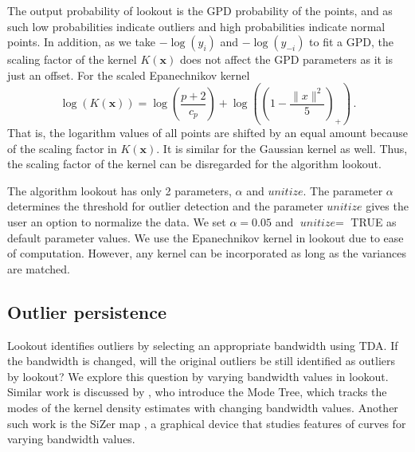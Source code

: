 \documentclass[11pt,a4paper,]{article}
\theoremstyle{definition}
\theoremstyle{definition}
\theoremstyle{definition}
\theoremstyle{remark}
\begin{document}
The output probability of lookout is the GPD probability of the points, and as such low probabilities indicate outliers and high probabilities indicate normal points. In addition, as we take \(-\log(y_i)\) and \(-\log(y_{-i})\) to fit a GPD, the scaling factor of the kernel \(K(\bm{x})\) does not affect the GPD parameters as it is just an offset. For the scaled Epanechnikov kernel
\begin{equation}\label{eq:lookout1}
    \log(K(\bm{x}))  = \log\left( \frac{p+2}{c_p}\right) + \log\left( \left(1 -\frac{\| x \|^2}{5} \right)_+\right)\, . 
\end{equation}
That is, the logarithm values of all points are shifted by an equal amount because of the scaling factor in \(K(\bm{x})\). It is similar for the Gaussian kernel as well. Thus, the scaling factor of the kernel can be disregarded for the algorithm lookout.

The algorithm lookout has only 2 parameters, \(\alpha\) and \(\textit{unitize}\). The parameter \(\alpha\) determines the threshold for outlier detection and the parameter \(\textit{unitize}\) gives the user an option to normalize the data. We set \(\alpha= 0.05\) and \(\textit{unitize} =\) TRUE as default parameter values. We use the Epanechnikov kernel in lookout due to ease of computation. However, any kernel can be incorporated as long as the variances are matched.

\hypertarget{outlier-persistence}{%
\subsection{\texorpdfstring{Outlier persistence \label{subsec:persistence}}{Outlier persistence }}\label{outlier-persistence}}

Lookout identifies outliers by selecting an appropriate bandwidth using TDA. If the bandwidth is changed, will the original outliers be still identified as outliers by lookout? We explore this question by varying bandwidth values in lookout. Similar work is discussed by \textcite{Minnotte1993}, who introduce the Mode Tree, which tracks the modes of the kernel density estimates with changing bandwidth values. Another such work is the SiZer map \autocite{Chaudhuri1999}, a graphical device that studies features of curves for varying bandwidth values.
\end{document}
